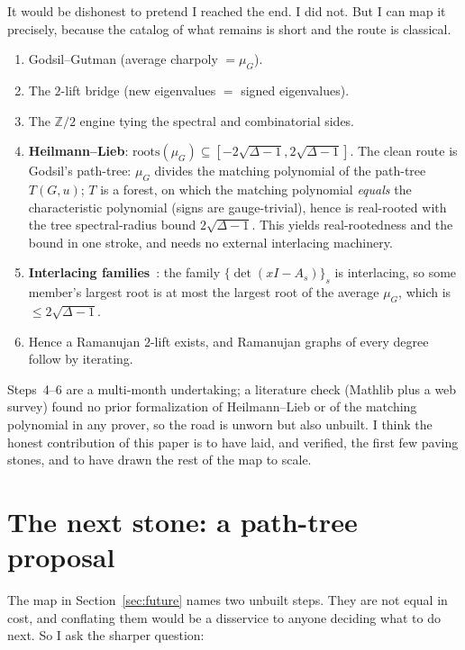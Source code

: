 \documentclass[11pt]{article}
\newcommand{\Z}{\mathbb{Z}}
\begin{document}
It would be dishonest to pretend I reached the end. I did not. But I can map
it precisely, because the catalog of what remains is short and the route is
classical.
\begin{enumerate}\itemsep2pt
\item[$\checkmark$] Godsil--Gutman (average charpoly $=\mu_G$).
\item[$\checkmark$] The $2$-lift bridge (new eigenvalues $=$ signed eigenvalues).
\item[$\checkmark$] The $\Z/2$ engine tying the spectral and combinatorial sides.
\item[$\circ$] \textbf{Heilmann--Lieb}: $\mathrm{roots}(\mu_G)\subseteq
  [-2\sqrt{\Delta-1},2\sqrt{\Delta-1}]$. The clean route is Godsil's path-tree:
  $\mu_G$ divides the matching polynomial of the path-tree $T(G,u)$; $T$ is a
  forest, on which the matching polynomial \emph{equals} the characteristic
  polynomial (signs are gauge-trivial), hence is real-rooted with the tree
  spectral-radius bound $2\sqrt{\Delta-1}$. This yields real-rootedness and the
  bound in one stroke, and needs no external interlacing machinery.
\item[$\circ$] \textbf{Interlacing families}~\cite{MSS2015a}: the family
  $\{\det(xI-A_s)\}_s$ is interlacing, so some member's largest root is at most
  the largest root of the average $\mu_G$, which is $\le2\sqrt{\Delta-1}$.
\item[$\circ$] Hence a Ramanujan $2$-lift exists, and Ramanujan graphs of every
  degree follow by iterating.
\end{enumerate}
Steps~4--6 are a multi-month undertaking; a literature check (Mathlib plus a web
survey) found no prior formalization of Heilmann--Lieb or of the matching
polynomial in any prover, so the road is unworn but also unbuilt. I think the
honest contribution of this paper is to have laid, and verified, the first few
paving stones, and to have drawn the rest of the map to scale.

\section{The next stone: a path-tree proposal}
\label{sec:proposal}

The map in Section~\ref{sec:future} names two unbuilt steps. They are not equal
in cost, and conflating them would be a disservice to anyone deciding what to do
next. So I ask the sharper question:
\end{document}

